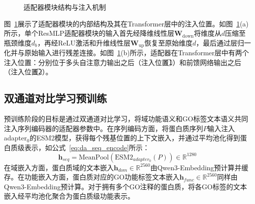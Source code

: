 \begin{figure}[htbp]
\caption{适配器模块结构与注入机制}\label{fig:adapter_architecture}
\end{figure}

图~\ref{fig:adapter_architecture}展示了适配器模块的内部结构及其在Transformer层中的注入位置。如图~\ref{fig:adapter_architecture}(a)所示，单个ResMLP适配器模块的输入首先经降维线性层$\mathbf{W}_{\mathrm{down}}$将维度从$d$压缩至瓶颈维度$d_b$，再经ReLU激活和升维线性层$\mathbf{W}_{\mathrm{up}}$恢复至原始维度$d$，最后通过层归一化并与原始输入进行残差连接。如图~\ref{fig:adapter_architecture}(b)所示，适配器在Transformer层中有两个注入位置：分别位于多头自注意力输出之后（注入位置\textcircled{\scriptsize 1}）和前馈网络输出之后（注入位置\textcircled{\scriptsize 2}）。

\subsection{双通道对比学习预训练}

预训练阶段的目标是通过双通道对比学习，将域功能语义和GO标签文本语义共同注入序列编码器的适配器参数中。在序列编码方面，将蛋白质序列$P$输入注入adapter$_0$的ESM2模型，获得每个残基位置的上下文嵌入，并通过平均池化得到蛋白质级表示，如公式~\eqref{eq:da_seq_encode}所示：
\begin{equation}
\label{eq:da_seq_encode}
    \mathbf{h}_{seq} = \text{MeanPool}(\text{ESM2}_{adapter_0}(P)) \in \mathbb{R}^{1280}
\end{equation}
在域嵌入方面，蛋白质域的文本嵌入$\mathbf{h}_{dom} \in \mathbb{R}^{2560}$由Qwen3-Embedding预计算并缓存。在功能嵌入方面，蛋白质对应的GO功能标签文本嵌入$\mathbf{h}_{func} \in \mathbb{R}^{2560}$同样由Qwen3-Embedding预计算。对于拥有多个GO注释的蛋白质，将各GO标签的文本嵌入经平均池化聚合为蛋白质级功能表示。

